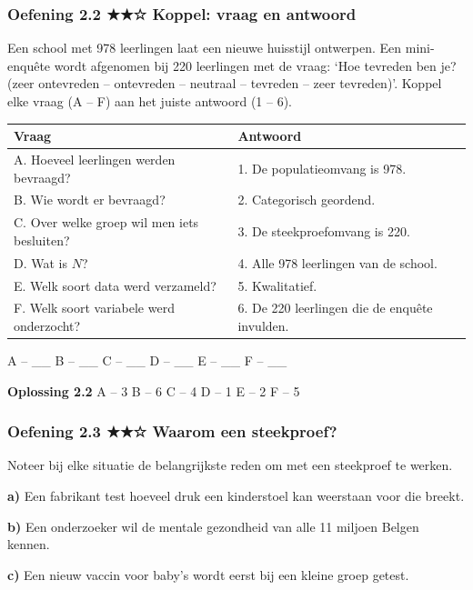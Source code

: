 \subsubsection*{Oefening 2.2 \quad ★★☆ \quad Koppel: vraag en antwoord}

Een school met 978 leerlingen laat een nieuwe huisstijl ontwerpen. Een mini-enquête wordt afgenomen bij 220 leerlingen met de vraag: ‘Hoe tevreden ben je? (zeer ontevreden – ontevreden – neutraal – tevreden – zeer tevreden)’. Koppel elke vraag (A – F) aan het juiste antwoord (1 – 6).

\begin{tabular}{ll}
\hline
Vraag & Antwoord \\
\hline
A. Hoeveel leerlingen werden bevraagd? & 1. De populatieomvang is 978. \\
B. Wie wordt er bevraagd? & 2. Categorisch geordend. \\
C. Over welke groep wil men iets besluiten? & 3. De steekproefomvang is 220. \\
D. Wat is $N$? & 4. Alle 978 leerlingen van de school. \\
E. Welk soort data werd verzameld? & 5. Kwalitatief. \\
F. Welk soort variabele werd onderzocht? & 6. De 220 leerlingen die de enquête invulden. \\
\hline
\end{tabular}

A – \_\_ \quad B – \_\_ \quad C – \_\_ \quad D – \_\_ \quad E – \_\_ \quad F – \_\_

\begin{oplossing}
\textbf{Oplossing 2.2} \quad A – 3 \quad B – 6 \quad C – 4 \quad D – 1 \quad E – 2 \quad F – 5
\end{oplossing}

\subsubsection*{Oefening 2.3 \quad ★★☆ \quad Waarom een steekproef?}

Noteer bij elke situatie de belangrijkste reden om met een steekproef te werken.

\textbf{a)} Een fabrikant test hoeveel druk een kinderstoel kan weerstaan voor die breekt. \lijn

\textbf{b)} Een onderzoeker wil de mentale gezondheid van alle 11 miljoen Belgen kennen. \lijn

\textbf{c)} Een nieuw vaccin voor baby’s wordt eerst bij een kleine groep getest. \lijn

